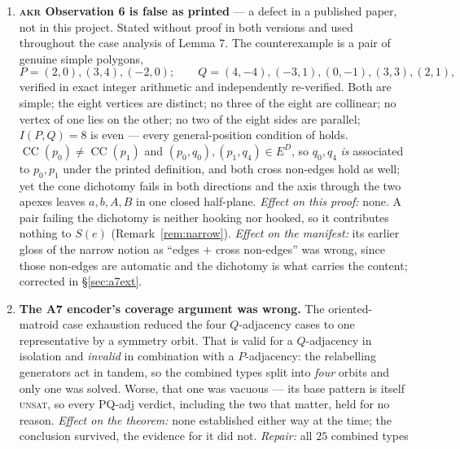 \documentclass[11pt,a4paper]{article}
\theoremstyle{plain}
\theoremstyle{definition}
\theoremstyle{remark}
\newcommand{\ED}{E^{D}}
\newcommand{\CC}{\operatorname{CC}}
\begin{document}
\begin{enumerate}[leftmargin=*]
    ``no line meets all four sides'', which does not license what the computation
    tests. \emph{Effect if it had been implemented:} severe --- $2{,}268$
    exceptional objects instead of $16$, and an infeasible search.
    \emph{Repair:} the strict, vertex-avoiding form $(\star)$.
    \emph{Superseded by:} Lemma~\ref{lem:A} and Remark~\ref{rem:strict}.
  \item \textbf{\textsc{akr} Observation 6 is false as printed} --- a defect in a
    published paper, not in this project. Stated without proof in both versions
    and used throughout the case analysis of Lemma 7. The counterexample is a
    pair of genuine simple polygons,
    \[
      P=(2,0),(3,4),(-2,0);\qquad Q=(4,-4),(-3,1),(0,-1),(3,3),(2,1),
    \]
    verified in exact integer arithmetic and independently re-verified. Both are
    simple; the eight vertices are distinct; no three of the eight are collinear;
    no vertex of one lies on the other; no two of the eight sides are parallel;
    $I(P,Q)=8$ is even --- every general-position condition of
    \cite[\S3]{AckermanKeszeghRote2022} holds. $\CC(p_0)\neq\CC(p_1)$ and
    $(p_0,q_0),(p_1,q_4)\in\ED$, so $q_0,q_4$ \emph{is} associated to $p_0,p_1$
    under the printed definition, and both cross non-edges hold as well; yet the
    cone dichotomy fails in both directions and the axis through the two apexes
    leaves $a,b,A,B$ in one closed half-plane. \emph{Effect on this proof:} none.
    A pair failing the dichotomy is neither hooking nor hooked, so it contributes
    nothing to $S(e)$ (Remark~\ref{rem:narrow}). \emph{Effect on the
    manifest:} its earlier gloss of the narrow notion as ``edges $+$ cross
    non-edges'' was wrong, since those non-edges are automatic and the dichotomy
    is what carries the content; corrected in \S\ref{sec:a7ext}.
  \item \textbf{The \textsf{A7} encoder's coverage argument was wrong.} The
    oriented-matroid case exhaustion reduced the four $Q$-adjacency cases to one
    representative by a symmetry orbit. That is valid for a $Q$-adjacency in
    isolation and \emph{invalid} in combination with a $P$-adjacency: the
    relabelling generators act in tandem, so the combined types split into
    \emph{four} orbits and only one was solved. Worse, that one was vacuous ---
    its base pattern is itself \textsc{unsat}, so every \textsf{PQ-adj} verdict,
    including the two that matter, held for no reason. \emph{Effect on the
    theorem:} none established either way at the time; the conclusion survived,
    the evidence for it did not. \emph{Repair:} all $25$ combined types

\end{enumerate}
\end{document}
